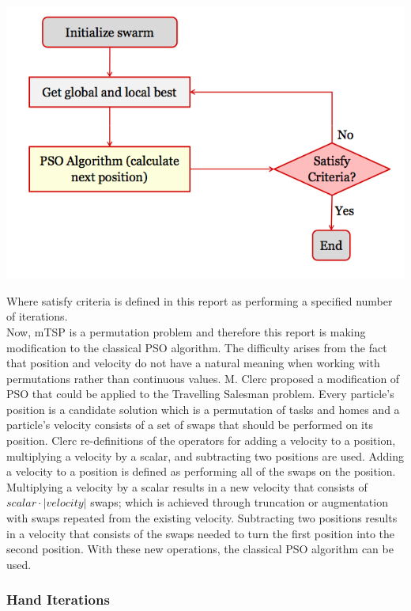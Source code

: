 \documentclass[a4paper]{article}
\begin{document}
\includegraphics[width=1\textwidth]{images/PSO.png}

Where satisfy criteria is defined in this report as performing a specified number of iterations.\\

Now, mTSP is a permutation problem and therefore this report is making modification to the classical PSO algorithm.
The difficulty arises from the fact that position and velocity do not have a natural meaning when working
with permutations rather than continuous values.
M. Clerc proposed a modification of PSO that could be applied to the Travelling Salesman problem.
Every particle's position is a candidate solution which is a permutation of tasks and homes and
a particle's velocity consists of a set of swaps that should be performed on its position.
Clerc re-definitions of the operators for adding a velocity to a position, multiplying a velocity by a scalar, and subtracting two positions
are used. Adding a velocity to a position is defined as performing all of the swaps on the position.
Multiplying a velocity by a scalar results in a new velocity that consists of $scalar\cdot |velocity|$ swaps; which is achieved
through truncation or augmentation with swaps repeated from the existing velocity.
Subtracting two positions results in a velocity that consists of the swaps needed to turn the first position into the second position.
With these new operations, the classical PSO algorithm can be used. \cite{PermutationPSO}

\subsubsection{Hand Iterations}
\end{document}
